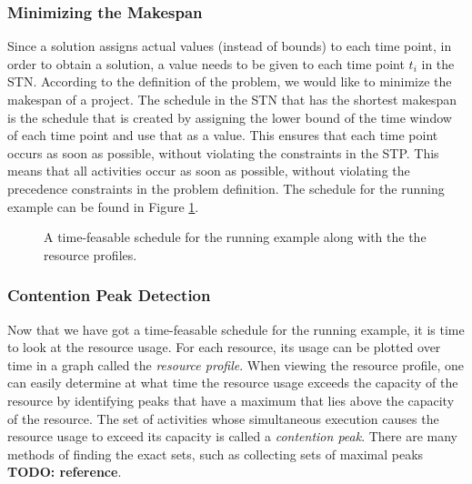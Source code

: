\documentclass{article}
\theoremstyle{definition}
\newcommand{\inputtikz}[1]{}
\newcommand{\TODO}[1]{{\color{red}\textbf{TODO: #1}}}
\begin{document}
\subsubsection{Minimizing the Makespan}
Since a solution assigns actual values (instead of bounds) to each time point, in order to obtain a solution, a value needs to be given to each time point $t_i$ in the STN. According to the definition of the problem, we would like to minimize the makespan of a project. The schedule in the STN that has the shortest makespan is the schedule that is created by assigning the lower bound of the time window of each time point and use that as a value. This ensures that each time point occurs as soon as possible, without violating the constraints in the STP. This means that all activities occur as soon as possible, without violating the precedence constraints in the problem definition. The schedule for the running example can be found in Figure \ref{fig:resource_graph}.

\begin{figure}[h]
	\centering
	\inputtikz{schedule_infeasible_profile}
	\caption{A time-feasable schedule for the running example along with the the resource profiles.}
	\label{fig:resource_graph}
\end{figure}

\begin{comment}
\TODO{wat is handiger voor het uitleggen, infeasible profile alleen of de vergelijking van de schedules?}
\begin{figure}[h]
	\centering
	\inputtikz{schedule_comparison}
	\caption{Two different schedules for the running example and their resource profiles. }
	\label{fig:resource_graph}
\end{figure}
\end{comment}

\subsubsection{Contention Peak Detection}
Now that we have got a time-feasable schedule for the running example, it is time to look at the resource usage. For each resource, its usage can be plotted over time in a graph called the \emph{resource profile}. When viewing the resource profile, one can easily determine at what time the resource usage exceeds the capacity of the resource by identifying peaks that have a maximum that lies above the capacity of the resource. The set of activities whose simultaneous execution causes the resource usage to exceed its capacity is called a \emph{contention peak}. There are many methods of finding the exact sets, such as collecting sets of maximal peaks \TODO{reference}.
\end{document}
